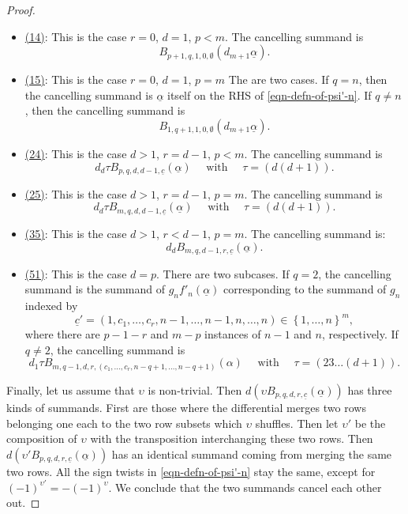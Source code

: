 \documentclass[10pt,a4paper]{amsart}
\begin{document}
\begin{proof}
\begin{itemize}
\item \underline{(14)}: This is the case $r = 0$, $d = 1$, $p < m$. The
cancelling summand is 
$$ B_{p+1, q, 1, 0, \emptyset}(d_{m+1}\underline{\alpha}). $$

\item \underline{(15)}: This is the case $r = 0$, $d = 1$, $p = m$ 
The are two cases. If $q = n$, then the cancelling summand is 
$\underline{\alpha}$ itself on the RHS of \eqref{eqn-defn-of-psi'-n}. 
If $q \neq n$, then the cancelling summand is
$$ B_{1, q+1, 1, 0, \emptyset}(d_{m+1}\underline{\alpha}). $$

\item \underline{(24)}: This is the case $d > 1$, $r = d-1$, $p < m$.
The cancelling summand is 
$$ d_d \tau B_{p, q, d, d-1, \underline{c}} (\underline{\alpha})
\quad \text{ with } \quad 
\tau = \left(d(d+1)\right).$$

\item \underline{(25)}: This is the case $d > 1$, $r = d-1$, $p = m$. 
The cancelling summand is 
$$ d_{d} \tau B_{m, q, d, d-1, \underline{c}} (\underline{\alpha})
\quad \text{ with } \quad 
\tau = \left(d(d+1)\right).$$

\item \underline{(35)}: This is the case $d > 1$, $r < d-1$, $p = m$.
The cancelling summand is:
$$ d_{d} B_{m,q,d-1,r,\underline{c}}(\underline{\alpha}). $$

\item \underline{(51)}: This is the case $d=p$. There are two
subcases. If $q = 2$, the cancelling summand is 
the summand of $g_n f'_n(\underline{\alpha})$ corresponding
to the summand of $g_n$ indexed by 
\begin{equation}
\label{eqn-indexing-c-for-the-summand-of-gf'}
\underline{c}' = (1,c_1, \dots, c_r,n-1, \dots, n-1, n, \dots, n) \in 
\left\{ 1, \dots, n\right\}^m,
\end{equation}
where there are $p-1-r$ and $m-p$ instances of $n-1$ and $n$,
respectively. If $q \neq 2$, the cancelling summand is
$$ d_{1} \tau B_{m,q-1,d,r,(c_1, \dots, c_r, n-q+1, \dots, n-q+1)}(\alpha)
\quad \text{ with } \quad \tau = (23\dots(d+1)).$$
\end{itemize}

Finally, let us assume that $\upsilon$ is non-trivial. 
Then 
$d \left(\upsilon B_{p,q,d,r,\underline{c}}(\underline{\alpha})\right)$ 
has three kinds of summands. First are those where the differential 
merges two rows belonging one each to the two row subsets which
$\upsilon$ shuffles. Then let $\upsilon'$ be the composition of
$\upsilon$ with the transposition interchanging these two rows. Then 
$d \left(\upsilon' B_{p,q,d,r,\underline{c}}(\underline{\alpha})\right)$ 
has an identical summand coming from merging the same two rows. All 
the sign twists in \eqref{eqn-defn-of-psi'-n} stay the same, 
except for $(-1)^{\upsilon'} = - (-1)^{\upsilon}$. We conclude that
the two summands cancel each other out. 


\end{proof}
\end{document}
